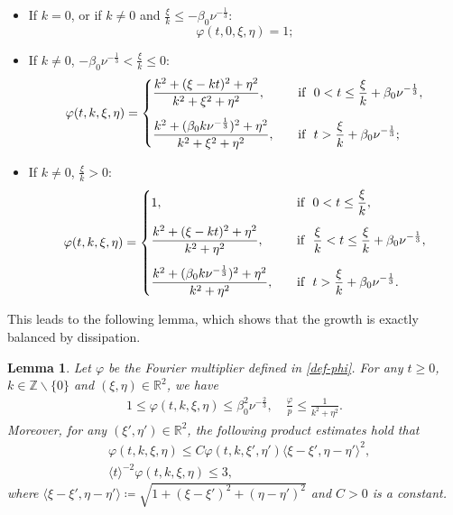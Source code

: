 \documentclass[11pt,reqno]{article}
\newtheorem{lemm}[theo]{Lemma}
\numberwithin{equation}{section}
\newcommand\R{{\mathbb R}}
\newcommand\Z{{\mathbb Z}}
\newcommand \tri {\coloneqq}
\let\f=\frac
\begin{document}
\begin{itemize}
\item[(1)] If $k=0$, or if $k\not=0$ and $\f{\xi}{k}\leq -\beta_0 \nu^{-\f13}$: 
$$\varphi(t,0,\xi,\eta)=1;$$


\item[(2)] If $k\not=0$, $-\beta_0 \nu^{-\f13}<\f{\xi}{k}\leq 0$:
\begin{align*}
	\varphi(t,k,\xi,\eta)=
	\begin{dcases}
		\f{k^2+(\xi-kt)^2+\eta^2}{k^2+\xi^2+\eta^2},\quad &\text{if}~~0<t\leq \f{\xi}{k}+\beta_0 \nu^{-\f13},
		\\[1ex]
		\f{k^2+(\beta_0 k\nu^{-\f13})^2+\eta^2}{k^2+\xi^2+\eta^2},\quad &\text{if}~~t>\f{\xi}{k}+\beta_0 \nu^{-\f13};
	\end{dcases}
\end{align*}

\item[(3)] If $k\not=0$, $\f{\xi}{k}> 0$:
\begin{align*}
	\varphi(t,k,\xi,\eta)=
	\begin{dcases}
		1,\quad &\text{if}~~0<t\leq \f{\xi}{k},
		\\[1ex]
		\f{k^2+(\xi-kt)^2+\eta^2}{k^2+\eta^2},\quad &\text{if}~~\f{\xi}{k}<t\leq \f{\xi}{k}+\beta_0 \nu^{-\f13},
		\\[1ex]
		\f{k^2+(\beta_0 k\nu^{-\f13})^2+\eta^2}{k^2+\eta^2},\quad &\text{if}~~t>\f{\xi}{k}+\beta_0 \nu^{-\f13}.
	\end{dcases}
\end{align*}

\end{itemize}

This leads to the following lemma, which shows that the growth is exactly balanced by dissipation.

\begin{lemm}\label{sec2:lem-0}
Let $\varphi$ be the Fourier multiplier defined in \eqref{def-phi}.
For any $t\geq0$, $k\in\Z \backslash \{0\}$ and $(\xi,\eta) \in\R^2$, we have
\begin{align}\label{est-varphi-1}
	1\leq \varphi(t,k,\xi,\eta)\leq \beta_0^2 \nu^{-\f23},\quad \f{\varphi}{p}\leq \f{1}{k^2+\eta^2}.
\end{align}
Moreover, for any $(\xi',\eta')\in\R^2$, the following product estimates hold that
\begin{align}
	&\varphi(t,k,\xi,\eta)\leq C  \varphi(t,k,\xi',\eta')\langle \xi-\xi',\eta-\eta'\rangle^2,
	\label{est-comm}
	\\
	&\langle t\rangle^{-2} \varphi(t,k,\xi,\eta) \leq 3,
	\label{est-varphi-t}
\end{align}
where $\langle \xi-\xi',\eta-\eta'\rangle\tri \sqrt{1+ (\xi-\xi')^2+(\eta-\eta')^2}$ and $C>0$ is a constant.
\end{lemm}
\end{document}

